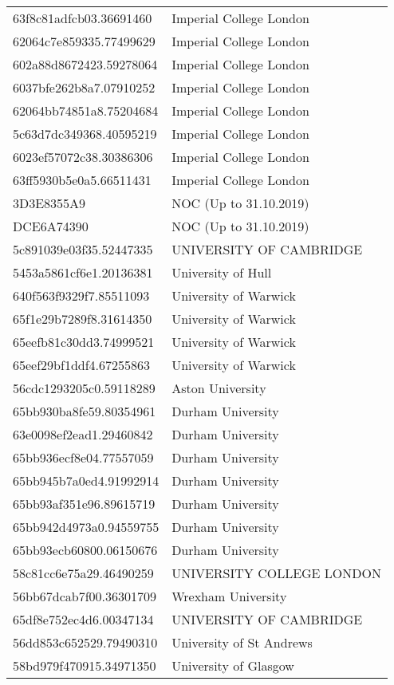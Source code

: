 \begin{tabular}{ll}
63f8c81adfcb03.36691460 & Imperial College London \\
62064c7e859335.77499629 & Imperial College London \\
602a88d8672423.59278064 & Imperial College London \\
6037bfe262b8a7.07910252 & Imperial College London \\
62064bb74851a8.75204684 & Imperial College London \\
5c63d7dc349368.40595219 & Imperial College London \\
6023ef57072c38.30386306 & Imperial College London \\
63ff5930b5e0a5.66511431 & Imperial College London \\
3D3E8355A9 & NOC (Up to 31.10.2019) \\
DCE6A74390 & NOC (Up to 31.10.2019) \\
5c891039e03f35.52447335 & UNIVERSITY OF CAMBRIDGE \\
5453a5861cf6e1.20136381 & University of Hull \\
640f563f9329f7.85511093 & University of Warwick \\
65f1e29b7289f8.31614350 & University of Warwick \\
65eefb81c30dd3.74999521 & University of Warwick \\
65eef29bf1ddf4.67255863 & University of Warwick \\
56cdc1293205c0.59118289 & Aston University \\
65bb930ba8fe59.80354961 & Durham University \\
63e0098ef2ead1.29460842 & Durham University \\
65bb936ecf8e04.77557059 & Durham University \\
65bb945b7a0ed4.91992914 & Durham University \\
65bb93af351e96.89615719 & Durham University \\
65bb942d4973a0.94559755 & Durham University \\
65bb93ecb60800.06150676 & Durham University \\
58c81cc6e75a29.46490259 & UNIVERSITY COLLEGE LONDON \\
56bb67dcab7f00.36301709 & Wrexham University \\
65df8e752ec4d6.00347134 & UNIVERSITY OF CAMBRIDGE \\
56dd853c652529.79490310 & University of St Andrews \\
58bd979f470915.34971350 & University of Glasgow \\

\end{tabular}
